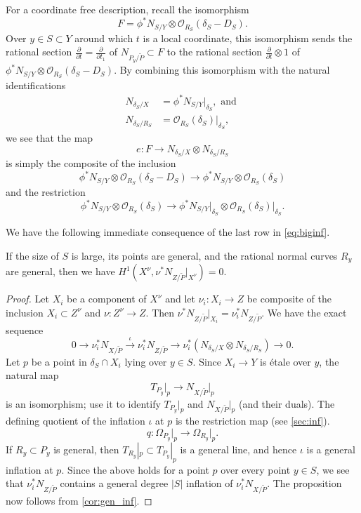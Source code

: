 \documentclass[11 pt]{amsart}
\renewcommand{\O}{{\mathcal O}}
\providecommand {\from}{{\colon}}
\numberwithin{equation}{section}
\begin{document}
For a coordinate free description, recall the isomorphism
\begin{equation}\label{eqn:identifyF}
  F = \phi^* N_{S/Y} \otimes \O_{R_S}\left(\delta_S - D_S\right).
\end{equation}
Over $y \in S \subset Y$ around which $t$ is a local coordinate, this isomorphism sends the rational section $\frac{\partial}{\partial t} = \frac{\partial}{\partial t_1}$ of $N_{P_y/\widetilde P} \subset F$ to the rational section $\frac{\partial}{\partial t} \otimes 1$ of $\phi^* N_{S/Y} \otimes \O_{R_S}\left(\delta_S - D_S\right)$.
By combining this isomorphism with the natural identifications
\begin{align*}
  N_{\delta_S/X} &= \phi^*N_{S/Y} \big|_{\delta_S}, \text{ and }\\
  N_{\delta_S/R_S} &= \O_{R_S}\left(\delta_S\right) \big | _{\delta_S},
\end{align*}
we see that the map
\begin{equation}\label{eq:desce}
  e \from F \to N_{\delta_S/X} \otimes N_{\delta_S/R_S}
\end{equation}
is simply the composite of the inclusion
\[ \phi^* N_{S/Y} \otimes \O_{R_S}\left(\delta_S - D_S\right) \to \phi^* N_{S/Y} \otimes \O_{R_S}\left(\delta_S\right)\]
and the restriction 
\[ \phi^* N_{S/Y} \otimes \O_{R_S}\left(\delta_S\right) \to \phi^* N_{S/Y}\big|_{\delta_S} \otimes \O_{R_S}\left(\delta_S\right)\big|_{\delta_S}.\]

We have the following immediate consequence of the last row in \eqref{eq:biginf}.
\begin{proposition}
  \label{lem:NXH1}
  If the size of $S$ is large, its points are general, and the rational normal curves $R_y$ are general, then we have $H^1(X^\nu, \nu^* N_{Z / \widetilde{P}}|_{X^\nu}) = 0$.
\end{proposition}
\begin{proof}
  Let $X_i$ be a component of $X^\nu$ and let $\nu_i \from X_i \to Z$ be composite of the inclusion $X_i \subset Z^\nu$ and $\nu \from Z^\nu \to Z$.
  Then $\nu^* N_{Z/\widetilde{P}}|_{X_i} = \nu_i^* N_{Z/\widetilde{P}}$.
  We have the exact sequence
  \[ 0 \to  \nu_i^* N_{X / \widetilde{P}} \xrightarrow{\iota} \nu_i^* N_{Z/\widetilde{P}} \to \nu_i^* (N_{\delta_S/X} \otimes N_{\delta_S/R_S}) \to 0.\]
  Let $p$ be a point in ${\delta_S} \cap X_i$ lying over $y \in S$.
  Since $X_i \to Y$ is \'etale over $y$, the natural map
  \[ T_{P_y} \big|_p \to N_{X / \widetilde{P}} \big|_p\]
  is an isomorphism; use it to identify $T_{P_y}|_p$ and $N_{X / \widetilde{P}} |_p$ (and their duals).
  The defining quotient of the inflation $\iota$ at $p$ is the restriction map (see  \eqref{sec:inf}).
  \[ q \from \Omega_{P_y}\big|_p \to \Omega_{R_y}|_p.\]
  If $R_y \subset P_y$ is general, then $T_{R_y}|_p \subset T_{P_y}|_p$ is a general line, and hence $\iota$ is a general inflation at $p$.
  Since the above holds for a point $p$ over every point $y \in S$, we see that $\nu_i^* N_{Z / \widetilde{P}}$ contains a general degree $|S|$ inflation of $\nu_i^* N_{X/\widetilde{P}}$.
  The proposition now follows from \autoref{cor:gen_inf}.
\end{proof}
\end{document}
